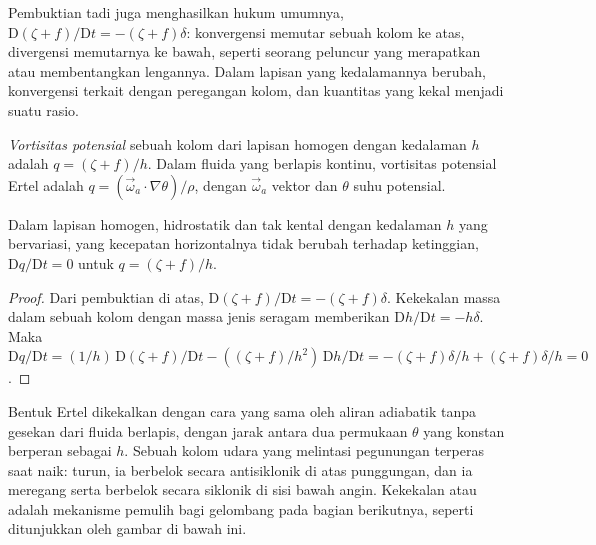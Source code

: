 Pembuktian tadi juga menghasilkan hukum umumnya, $\mathrm D(\zeta + f)/\mathrm Dt =
-(\zeta + f)\delta$: konvergensi memutar sebuah kolom ke atas, divergensi
memutarnya ke bawah, seperti seorang peluncur yang merapatkan atau membentangkan lengannya. Dalam lapisan yang kedalamannya
berubah, konvergensi terkait dengan peregangan kolom, dan
kuantitas yang kekal menjadi suatu rasio.

\begin{definition}\label{def:b3:atmospheric-dynamics:pv}
\emph{Vortisitas potensial} sebuah kolom dari lapisan
homogen dengan kedalaman $h$ adalah $q = (\zeta + f)/h$. Dalam fluida yang berlapis kontinu,
vortisitas potensial Ertel adalah $q = (\vec\omega_a\cdot
\nabla\theta)/\rho$, dengan $\vec\omega_a$ vektor  dan
$\theta$ suhu potensial.
\end{definition}

\begin{theorem}\label{thm:b3:atmospheric-dynamics:pv}
Dalam lapisan homogen, hidrostatik dan tak kental dengan kedalaman $h$ yang bervariasi,
yang kecepatan horizontalnya tidak berubah terhadap ketinggian, $\mathrm Dq/\mathrm Dt = 0$
untuk $q = (\zeta + f)/h$.
\end{theorem}

\begin{proof}
Dari pembuktian di atas, $\mathrm D(\zeta + f)/\mathrm Dt = -(\zeta + f)\delta$.
Kekekalan massa dalam sebuah kolom dengan massa jenis seragam memberikan $\mathrm Dh/\mathrm
Dt = -h\delta$. Maka $\mathrm Dq/\mathrm Dt = (1/h)\,\mathrm D(\zeta +
f)/\mathrm Dt - ((\zeta + f)/h^2)\,\mathrm Dh/\mathrm Dt = -(\zeta +
f)\delta/h + (\zeta + f)\delta/h = 0$.
\end{proof}

Bentuk Ertel dikekalkan dengan cara yang sama oleh aliran adiabatik tanpa gesekan
dari fluida berlapis, dengan jarak antara dua permukaan $\theta$ yang
konstan berperan sebagai $h$. Sebuah kolom udara yang melintasi
pegunungan terperas saat naik:  turun, ia
berbelok secara antisiklonik di atas punggungan, dan ia meregang serta berbelok
secara siklonik di sisi bawah angin. Kekekalan
 atau  adalah mekanisme pemulih bagi gelombang
pada bagian berikutnya, seperti ditunjukkan oleh gambar di bawah ini.

